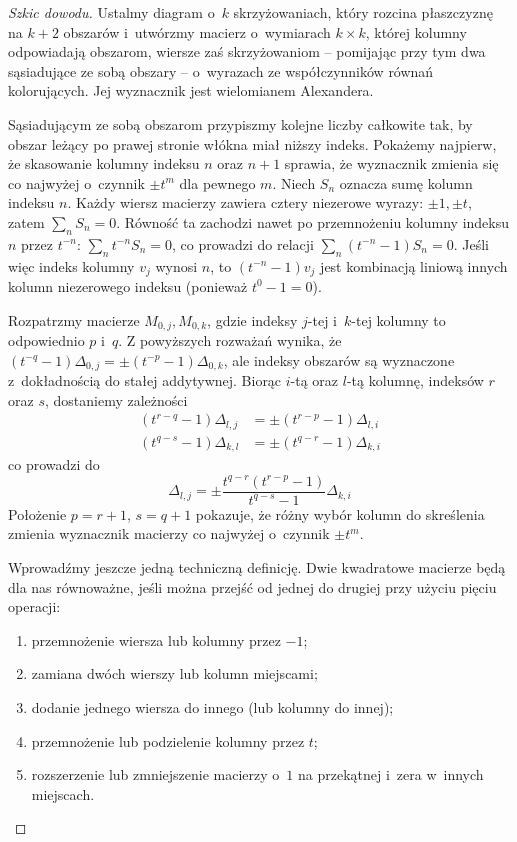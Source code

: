 \begin{proof}[Szkic dowodu]
    Ustalmy diagram o~$k$ skrzyżowaniach, który rozcina płaszczyznę na $k+2$ obszarów i~utwórzmy macierz o~wymiarach $k \times k$, której kolumny odpowiadają obszarom, wiersze zaś skrzyżowaniom -- pomijając przy tym dwa sąsiadujące ze sobą obszary -- o~wyrazach ze współczynników równań kolorujących.
    Jej wyznacznik jest wielomianem Alexandera.

    Sąsiadującym ze sobą obszarom przypiszmy kolejne liczby całkowite tak, by obszar leżący po prawej stronie włókna miał niższy indeks.
    Pokażemy najpierw, że skasowanie kolumny indeksu $n$ oraz $n+1$ sprawia, że wyznacznik zmienia się co najwyżej o~czynnik $\pm t^m$ dla pewnego $m$.
    Niech $S_n$ oznacza sumę kolumn indeksu $n$.
    Każdy wiersz macierzy zawiera cztery niezerowe wyrazy: $\pm 1, \pm t$, zatem $\sum_n S_n = 0$.
    Równość ta zachodzi nawet po przemnożeniu kolumny indeksu $n$ przez $t^{-n}$: $\sum_n t^{-n}S_n = 0$, co prowadzi do relacji $\sum_n (t^{-n}-1) S_n = 0$.
    Jeśli więc indeks kolumny $v_j$ wynosi $n$, to $(t^{-n}-1)v_j$ jest kombinacją liniową innych kolumn niezerowego indeksu (ponieważ $t^0 - 1 = 0$).

    Rozpatrzmy macierze $M_{0,j}, M_{0,k}$, gdzie indeksy $j$-tej i~$k$-tej kolumny to odpowiednio $p$ i~$q$.
    Z powyższych rozważań wynika, że $(t^{-q}-1) \Delta_{0,j} = \pm (t^{-p}-1)\Delta_{0,k}$, ale indeksy obszarów są wyznaczone z~dokładnością do stałej addytywnej.
    Biorąc $i$-tą oraz $l$-tą kolumnę, indeksów $r$ oraz $s$, dostaniemy zależności
    \begin{align}
        (t^{r-q}-1) \Delta_{l,j} & = \pm (t^{r-p} - 1)\Delta_{l,i} \\
        (t^{q-s}-1) \Delta_{k,l} & = \pm (t^{q-r} - 1)\Delta_{k,i}
    \end{align}
    co prowadzi do
    \begin{equation}
        \Delta_{l,j} = \pm \frac{t^{q-r}(t^{r-p}-1)}{t^{q-s}-1} \Delta_{k,i}
    \end{equation}
    Położenie $p = r +1$, $s =q+1$ pokazuje, że różny wybór kolumn do skreślenia zmienia wyznacznik macierzy co najwyżej o~czynnik $\pm t^m$.

    Wprowadźmy jeszcze jedną techniczną definicję.
    Dwie kwadratowe macierze będą dla nas równoważne, jeśli można przejść od jednej do drugiej przy użyciu pięciu operacji:
    \begin{enumerate}[leftmargin=*]
    \itemsep0em
        \item przemnożenie wiersza lub kolumny przez $-1$;
        \item zamiana dwóch wierszy lub kolumn miejscami;
        \item dodanie jednego wiersza do innego (lub kolumny do innej);
        \item przemnożenie lub podzielenie kolumny przez $t$;
        \item rozszerzenie lub zmniejszenie macierzy o~$1$ na przekątnej i~zera w~innych miejscach.
    \end{enumerate}


\end{proof}
